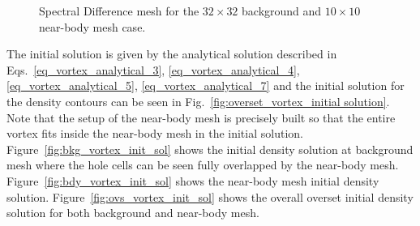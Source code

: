 \begin{figure}[H]
{		\label{fig:overset_vortex_p3_mesh_bkg}
    }
    \caption{Spectral Difference mesh for the $32 \times 32$ background and $10 \times 10$ near-body mesh case.}
    \label{fig:overset_vortex_sd_mesh}
\end{figure}
%
%
The initial solution is given by the analytical solution described in Eqs.\ \ref{eq_vortex_analytical_3}, \ref{eq_vortex_analytical_4}, \ref{eq_vortex_analytical_5}, \ref{eq_vortex_analytical_7} and the initial solution for the density contours can be seen in Fig.\ \ref{fig:overset_vortex_initial solution}. Note that the setup of the near-body mesh is precisely built so that the entire vortex fits inside the near-body mesh in the initial solution. Figure\ \ref{fig:bkg_vortex_init_sol} shows the initial density solution at background mesh where the hole cells can be seen fully overlapped by the near-body mesh. Figure\ \ref{fig:bdy_vortex_init_sol} shows the near-body mesh initial density solution. Figure\ \ref{fig:ovs_vortex_init_sol} shows the overall overset initial density solution for both background and near-body mesh.
%


